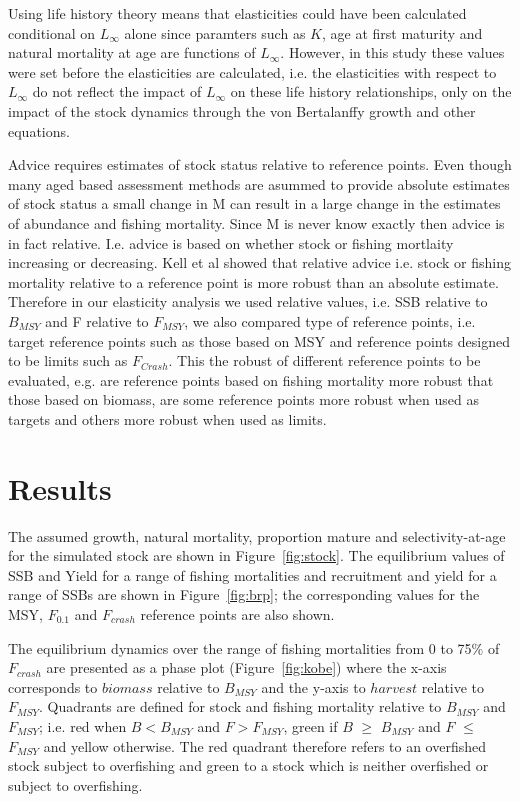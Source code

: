 \documentclass[10pt]{article}
\begin{document}
Using life history theory means that elasticities could have been calculated conditional on $L_{\infty}$ alone since paramters such as $K$, age at first maturity 
and natural mortality at age are functions of $L_{\infty}$. However, in this study these values were set before the elasticities are calculated, i.e. the elasticities 
with respect to $L_{\infty}$ do not reflect the impact of $L_{\infty}$ on these life history relationships, only on the impact of the stock dynamics 
through the von Bertalanffy growth and other equations.  

Advice requires estimates of stock status relative to reference points. Even though many aged based assessment methods are asummed to provide absolute 
estimates of stock status a small change in M can result in a large change in the estimates of abundance and fishing mortality. Since M is never know 
exactly then advice is in fact relative. I.e. advice is based on whether stock or fishing mortlaity increasing or decreasing. Kell et al showed that relative advice i.e. 
stock or fishing mortality relative to a reference point is more robust than an absolute estimate. Therefore in our elasticity analysis we used relative 
values, i.e. SSB relative to $B_{MSY}$ and F relative to $F_{MSY}$, we also compared type of reference points, i.e. target reference points such as those 
based on MSY and reference points designed to be limits such as $F_{Crash}$. This the robust of different reference points to be evaluated, e.g. are reference points 
based on fishing mortality more robust that those based on biomass, are some reference points more robust when used as targets and others more robust 
when used as limits. 

\section*{Results}

The assumed growth, natural mortality, proportion mature and selectivity-at-age for the simulated stock are shown in Figure~\ref{fig:stock}. The 
equilibrium values of SSB and Yield for a range of fishing mortalities and recruitment and yield for a range of SSBs are shown in Figure~\ref{fig:brp}; 
the corresponding values for the MSY, $F_{0.1}$ and $F_{crash}$ reference points are also shown. 

The equilibrium dynamics over the range of fishing mortalities from 0 to 75\% of $F_{crash}$ are presented as a phase plot (Figure~\ref{fig:kobe})
where the x-axis corresponds to $biomass$ relative to $B_{MSY}$ and the y-axis to $harvest$ relative to $F_{MSY}$.
Quadrants are defined for stock and fishing mortality relative to $B_{MSY}$ and $F_{MSY}$; i.e. red when $B<B_{MSY}$ and $F>F_{MSY}$, green 
if $B$ $\geq$ $B_{MSY}$ and $F$ $\leq$ $F_{MSY}$ and yellow otherwise. The red quadrant therefore refers to an overfished stock subject to overfishing and  
green to a stock which is neither overfished or subject to overfishing.
\end{document}

